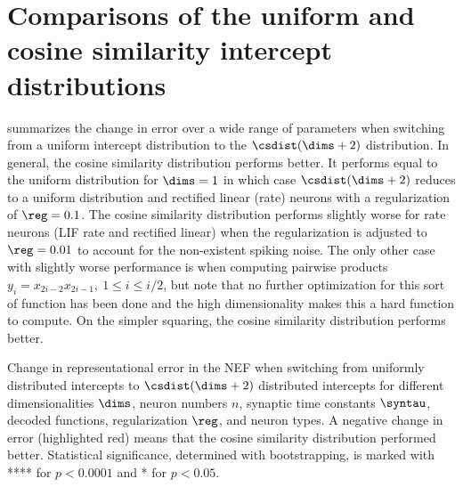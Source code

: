 \chapter{Comparisons of the uniform and cosine similarity intercept distributions}\label{apdx:hdrep}
 summarizes the change in error over a wide range of parameters when switching from a uniform intercept distribution to the $\csdist(\dims + 2)$ distribution.
In general, the cosine similarity distribution performs better.
It performs equal to the uniform distribution for $\dims = 1$ in which case $\csdist(\dims + 2)$ reduces to a uniform distribution and rectified linear (rate) neurons with a regularization of $\reg = 0.1$.
The cosine similarity distribution performs slightly worse for rate neurons (LIF rate and rectified linear) when the regularization is adjusted to $\reg = 0.01$ to account for the non-existent spiking noise.
The only other case with slightly worse performance is when computing pairwise products $y_i = x_{2i - 2} x_{2i - 1},\ 1 \leq i \leq i/2$, but note that no further optimization for this sort of function has been done and the high dimensionality makes this a hard function to compute.
On the simpler squaring, the cosine similarity distribution performs better.
\begin{table}
    \begin{addmargin*}[0mm]{-31pt}
        \caption[Comparison of uniformly and $\csdist(\dims + 2)$ distributed intercepts.]{Change in representational error in the NEF when switching from uniformly distributed intercepts to $\csdist(\dims + 2)$ distributed intercepts for different dimensionalities $\dims$, neuron numbers $n$, synaptic time constants $\syntau$, decoded functions, regularization $\reg$, and neuron types.
    A negative change in error (highlighted red) means that the cosine similarity distribution performed better.
    Statistical significance, determined with bootstrapping, is marked with **** for $p < 0.0001$ and * for $p < 0.05$.}\label{tbl:csdist}
        \scriptsize\centering
        
    \end{addmargin*}
\end{table}
